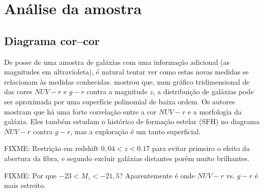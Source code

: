



\chapter{Análise da amostra}
\label{sec:Analise}

\section{Diagrama cor--cor}

De posse de uma amostra de galáxias com uma informação adicional (as magnitudes
em ultravioleta), é natural tentar ver como estas novas medidas se relacionam às
medidas conhecidas. \citet{Chilingarian2011} mostrou que, num gráfico
tridimensional de das cores $NUV-r$ e $g-r$ contra a magnitude $z$, a
distribuição de galáxias pode ser aproximada por uma superfície polinomial de
baixa ordem. Os autores mostram que há uma forte correlação entre a cor $NUV-r$
e a morfologia da galáxia. Eles também estudam o histórico de formação estelar
(SFH) no diagrama $NUV-r$ contra $g-r$, mas a exploração é um tanto superficial.

FIXME: Restrição em redshift $0,04 < z < 0.17$ para evitar primeiro o efeito da
abertura da fibra, e segundo excluir galáxias distantes porém muito brilhantes.

FIXME: Por que $-23 < M_z < -21,5$? Aparentemente é onde $NUV-r$ vs. $g-r$ é
mais estreito.

